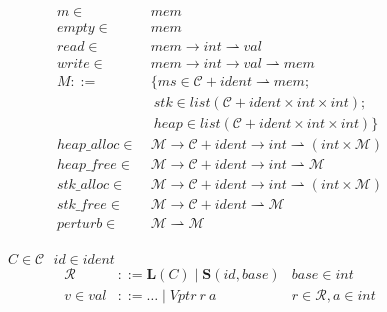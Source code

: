 \documentclass{article}
\begin{document}
\begin{figure}
  \begin{minipage}[t]{0.5\textwidth}
    \vspace{0em}
    \[\begin{split}
    m \in ~ & \mathit{mem} \\
    \mathit{empty} \in ~ & \mathit{mem} \\
    \mathit{read} \in ~ & \mathit{mem} \rightarrow \mathit{int} \rightharpoonup \mathit{val} \\
    \mathit{write} \in ~ & \mathit{mem} \rightarrow \mathit{int} \rightarrow \mathit{val}
    \rightharpoonup \mathit{mem} \\
    M ::= ~ & \{
      ms \in \mathcal{C} + \mathit{ident} \rightharpoonup \mathit{mem}; \\
     & ~ stk \in list (\mathcal{C} + \mathit{ident} \times \mathit{int} \times \mathit{int}); \\
     & ~ heap \in list (\mathcal{C} + \mathit{ident} \times \mathit{int} \times \mathit{int})
    \} \\
    \mathit{heap\_alloc} \in ~ & \mathcal{M} \rightarrow \mathcal{C} + \mathit{ident} \rightarrow
    \mathit{int} \rightharpoonup (\mathit{int} \times \mathcal{M}) \\
    \mathit{heap\_free} \in ~ & \mathcal{M} \rightarrow \mathcal{C} + \mathit{ident} \rightarrow
    \mathit{int} \rightharpoonup \mathcal{M} \\
    \mathit{stk\_alloc} \in ~ & \mathcal{M} \rightarrow \mathcal{C} + \mathit{ident} \rightarrow
    \mathit{int} \rightharpoonup (\mathit{int} \times \mathcal{M}) \\
    \mathit{stk\_free} \in ~ & \mathcal{M} \rightarrow \mathcal{C} + \mathit{ident} \rightharpoonup
    \mathcal{M} \\
    \mathit{perturb} \in ~ & \mathcal{M} \rightharpoonup \mathcal{M} \\
    \end{split}\]
  \end{minipage}
  \begin{minipage}[t]{0.49\textwidth}
    \vspace{0em}
    \(C \in \mathcal{C}~~~ id \in \mathit{ident}~~~ \)
    \[\begin{aligned}
    \mathcal{R} & ::= \mathbf{L}(C) \mid \mathbf{S}(id, \mathit{base}) &
    \mathit{base} \in \mathit{int} \\
    v \in \mathit{val} & ::= \ldots \mid \mathit{Vptr} ~ r ~ a &
    r \in \mathcal{R}, a \in \mathit{int} \\

\end{aligned}\]
\end{minipage}
\end{figure}
\end{document}
